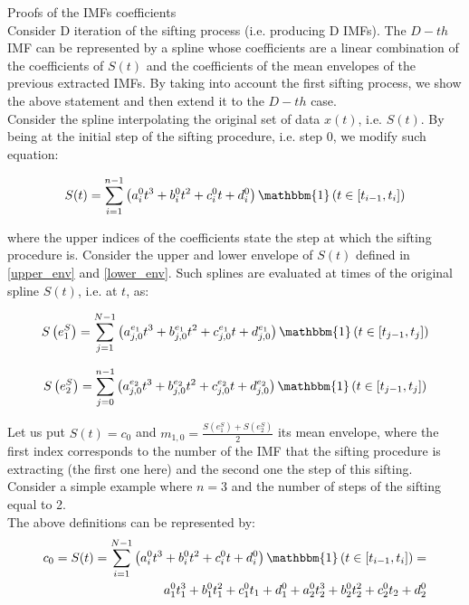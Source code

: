 \label{appendix_IMFS-coeff}
Proofs of the IMFs coefficients\\
Consider D iteration of the sifting process (i.e. producing D IMFs). The $D-th$ IMF can be represented by a spline whose coefficients are a linear combination of the coefficients of $S(t)$ and the coefficients of the mean envelopes  of the previous extracted IMFs. By taking into account the first sifting process, we show the above statement and then extend it to the $D-th$ case.\\

Consider the spline interpolating the original set of data $x(t)$, i.e. $S(t)$. 
By being at the initial step of the sifting procedure, i.e. step $0$, we modify such equation:

\begin{equation}
S(t) = \sum_{i=1}^{n-1} \left(a_i^0 t^3 +b_i^0 t^2 + c_i^0 t +d_i^0 \right) \mathbbm{1} \left( t \in \left[ t_{i-1},t_i \right] \right) 
\end{equation} 

where the upper indices of the coefficients state the step at which the sifting procedure is. Consider the upper and lower envelope of $S(t)$ defined in \ref{upper_env} and \ref{lower_env}. Such splines are evaluated at times of the original spline $S(t)$, i.e. at $t$, as:

\begin{equation}
S\left( e_1^S \right) = \sum_{j=1}^{N-1} \left( a_{j,0}^{e_1} t^3 + b_{j,0}^{e_1} t^2 + c_{j,0}^{e_1} t +d_{j,0}^{e_1} \right) \mathbbm{1} \left(t \in \left[t_{j-1}, t_j \right] \right)
\end{equation}

\begin{equation}
S\left( e_2^S \right) = \sum_{j=0}^{n-1} \left( a_{j,0}^{e_2} t^3 + b_{j,0}^{e_2} t^2 + c_{j,0}^{e_2} t +d_{j,0}^{e_2} \right) \mathbbm{1} \left(t \in \left[t_{j-1}, t_j \right] \right)
\end{equation}

Let us put $S(t) = c_0$ and $m_{1,0} = \frac{S(e_1^S) + S(e_2^S)}{2}$ its mean envelope, where the first index corresponds to the number of the IMF that the sifting procedure is extracting (the first one here) and the second one the step of this sifting. Consider a simple example where $n=3$ and the number of steps of the sifting equal to 2.\\
The above definitions can be represented by:
\begin{equation}
\begin{split}
c_0 = S(t) = \sum_{i=1}^{N-1} \left(a_i^0 t^3 +b_i^0 t^2 + c_i^0 t +d_i^0 \right) \mathbbm{1} \left( t \in \left[ t_{i-1},t_i \right] \right) = \\
a_1^0 t_1^3 + b_1^0 t_1^2 + c_1^0 t_1 + d_1^0 + a_2^0 t_2^3 + b_2^0 t_2^2 + c_2^0 t_2 + d_2^0 
\end{split} 
\end{equation}

